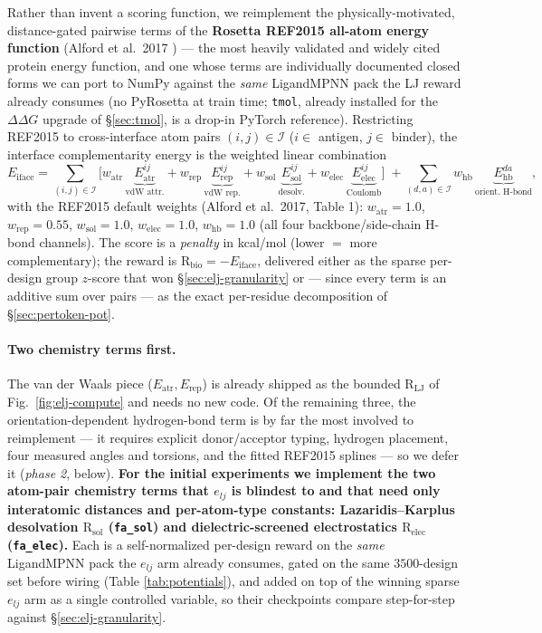 \documentclass[11pt]{article}
\newcommand{\R}{\mathrm{R}}
\newcommand{\ttk}[1]{\texttt{\small #1}}
\begin{document}
Rather than invent a scoring function, we reimplement the physically-motivated, distance-gated
pairwise terms of the \textbf{Rosetta REF2015 all-atom energy function} (Alford et al.\ 2017
\cite{alford2017}) --- the most heavily validated and widely cited protein energy function, and one
whose terms are individually documented closed forms we can port to NumPy against the \emph{same}
LigandMPNN pack the LJ reward already consumes (no PyRosetta at train time; \ttk{tmol}, already
installed for the $\Delta\Delta G$ upgrade of \S\ref{sec:tmol}, is a drop-in PyTorch reference).
Restricting REF2015 to cross-interface atom pairs $(i,j)\in\mathcal I$ ($i\in$ antigen, $j\in$
binder), the interface complementarity energy is the weighted linear combination
\begin{equation}
E_{\mathrm{iface}}=\!\!\sum_{(i,j)\in\mathcal I}\!\Big[
   w_{\mathrm{atr}}\,\underbrace{E^{ij}_{\mathrm{atr}}}_{\text{vdW attr.}}
  +w_{\mathrm{rep}}\,\underbrace{E^{ij}_{\mathrm{rep}}}_{\text{vdW rep.}}
  +w_{\mathrm{sol}}\,\underbrace{E^{ij}_{\mathrm{sol}}}_{\text{desolv.}}
  +w_{\mathrm{elec}}\,\underbrace{E^{ij}_{\mathrm{elec}}}_{\text{Coulomb}}\Big]
  \;+\!\!\sum_{(d,a)\in\mathcal I}\!\! w_{\mathrm{hb}}\,\underbrace{E^{da}_{\mathrm{hb}}}_{\text{orient.\ H-bond}},
\label{eq:eiface}
\end{equation}
with the REF2015 default weights (Alford et al.\ 2017, Table 1): $w_{\mathrm{atr}}{=}1.0$,
$w_{\mathrm{rep}}{=}0.55$, $w_{\mathrm{sol}}{=}1.0$, $w_{\mathrm{elec}}{=}1.0$, $w_{\mathrm{hb}}{=}1.0$
(all four backbone/side-chain H-bond channels). The score is a \emph{penalty} in kcal/mol (lower $=$
more complementary); the reward is $\R_{\mathrm{bio}}=-E_{\mathrm{iface}}$, delivered either as the
sparse per-design group $z$-score that won \S\ref{sec:elj-granularity} or --- since every term is an
additive sum over pairs --- as the exact per-residue decomposition of \S\ref{sec:pertoken-pot}.

\paragraph{Two chemistry terms first.} The van der Waals piece ($E_{\mathrm{atr}},E_{\mathrm{rep}}$)
is already shipped as the bounded $\R_{\mathrm{LJ}}$ of Fig.\ \ref{fig:elj-compute} and needs no new
code. Of the remaining three, the orientation-dependent hydrogen-bond term is by far the most
involved to reimplement --- it requires explicit donor/acceptor typing, hydrogen placement, four
measured angles and torsions, and the fitted REF2015 splines --- so we defer it (\emph{phase 2},
below). \textbf{For the initial experiments we implement the two atom-pair chemistry terms that
$e_{lj}$ is blindest to and that need only interatomic distances and per-atom-type constants:
Lazaridis--Karplus desolvation $\R_{\mathrm{sol}}$ (\ttk{fa\_sol}) and dielectric-screened
electrostatics $\R_{\mathrm{elec}}$ (\ttk{fa\_elec}).} Each is a self-normalized per-design reward on
the \emph{same} LigandMPNN pack the $e_{lj}$ arm already consumes, gated on the same $3500$-design set
before wiring (Table \ref{tab:potentials}), and added on top of the winning sparse $e_{lj}$ arm as a
single controlled variable, so their checkpoints compare step-for-step against
\S\ref{sec:elj-granularity}.
\end{document}

